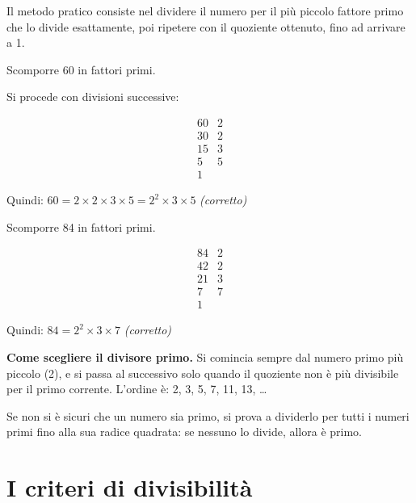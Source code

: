 Il metodo pratico consiste nel dividere il numero per il più piccolo fattore
primo che lo divide esattamente, poi ripetere con il quoziente ottenuto, fino
ad arrivare a 1.

\begin{esempio}
    Scomporre 60 in fattori primi.

    Si procede con divisioni successive:

    \[
        \begin{array}{r|l}
            60 & 2 \\
            30 & 2 \\
            15 & 3 \\
            5  & 5 \\
            1  &
        \end{array}
    \]

    Quindi: $60 = 2 \times 2 \times 3 \times 5 = 2^2 \times 3 \times 5$
    \quad\textit{(corretto)}
\end{esempio}

\begin{esempio}
    Scomporre 84 in fattori primi.

    \[
        \begin{array}{r|l}
            84 & 2 \\
            42 & 2 \\
            21 & 3 \\
            7  & 7 \\
            1  &
        \end{array}
    \]

    Quindi: $84 = 2^2 \times 3 \times 7$
    \quad\textit{(corretto)}
\end{esempio}

\begin{attenzione}
    \textbf{Come scegliere il divisore primo.} Si comincia sempre dal numero primo
    più piccolo (2), e si passa al successivo solo quando il quoziente non è più
    divisibile per il primo corrente. L'ordine è: 2, 3, 5, 7, 11, 13, \ldots

    Se non si è sicuri che un numero sia primo, si prova a dividerlo per tutti i
    numeri primi fino alla sua radice quadrata: se nessuno lo divide, allora è primo.
\end{attenzione}

\section{I criteri di divisibilità}

